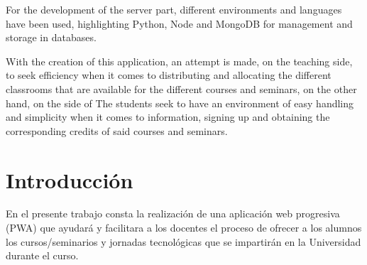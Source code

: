 \documentclass[a4paper, 12pt]{book}
\begin{document}
	For the development of the server part, different environments and languages have been used, highlighting Python, Node and MongoDB for management and storage in databases.

	With the creation of this application, an attempt is made, on the teaching side, to seek efficiency when it comes to distributing and allocating the different classrooms that are available for the different courses and seminars, on the other hand, on the side of The students seek to have an environment of easy handling and simplicity when it comes to information, signing up and obtaining the corresponding credits of said courses and seminars.




\tableofcontents 
\cleardoublepage
\listoffigures %



\cleardoublepage
\chapter{Introducción}
\label{sec:intro} %

En el presente trabajo consta la realización de una aplicación web progresiva (PWA) que ayudará y facilitara a los docentes el proceso de ofrecer a los alumnos los cursos/seminarios y jornadas tecnológicas que se impartirán en la Universidad durante el curso.
\end{document}
